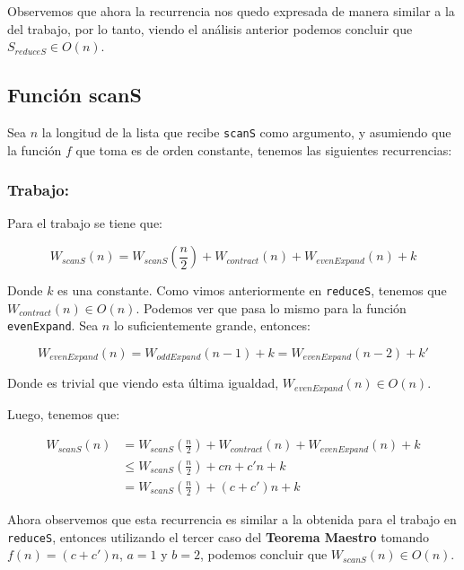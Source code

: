 \documentclass[11pt]{article}
\begin{document}
Observemos que ahora la recurrencia nos quedo expresada de manera similar
a la del trabajo, por lo tanto, viendo el análisis anterior podemos 
concluir que $S_{reduceS} \in O(n)$.


\subsection{Función scanS}

Sea $n$ la longitud de la lista que recibe \texttt{scanS} como argumento, y
asumiendo que la función $f$ que toma es de orden constante, tenemos las
siguientes recurrencias:

\subsubsection{Trabajo:}

Para el trabajo se tiene que:

\begin{equation*}
    W_{scanS}(n) = W_{scanS}(\frac{n}{2}) + W_{contract}(n) + W_{evenExpand}(n) + k
\end{equation*}

Donde $k$ es una constante. Como vimos anteriormente en \texttt{reduceS}, tenemos que
$W_{contract}(n) \in O(n)$. Podemos ver que pasa lo mismo para la función \texttt{evenExpand}. 
Sea $n$ lo suficientemente grande, entonces:

\begin{equation*}
    W_{evenExpand}(n) = W_{oddExpand}(n - 1) + k = W_{evenExpand}(n - 2) + k'
\end{equation*}

Donde es trivial que viendo esta última igualdad, $W_{evenExpand}(n) \in O(n)$.

Luego, tenemos que:

\begin{align*}
    W_{scanS}(n) & = W_{scanS}(\frac{n}{2}) + W_{contract}(n) + W_{evenExpand}(n) + k \\
                 & \leq W_{scanS}(\frac{n}{2}) + cn + c'n + k \\
                 & = W_{scanS}(\frac{n}{2}) + (c + c')n + k
\end{align*}

Ahora observemos que esta recurrencia es similar a la obtenida para el 
trabajo en \texttt{reduceS}, entonces utilizando el tercer caso del \textbf{Teorema Maestro} tomando
$f(n) = (c + c')n$, $a = 1$ y $b = 2$, podemos concluir que $W_{scanS}(n) \in O(n)$. 
\end{document}
